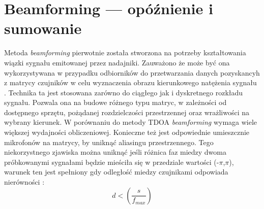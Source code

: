 \documentclass[eng,printmode]{mgr}
\begin{document}
\section{Beamforming --- opóźnienie i sumowanie}
Metoda {\em beamforming} pierwotnie została stworzona na potrzeby kształtowania wiązki sygnału emitowanej przez nadajniki. Zauważono że może być ona wykorzystywana w przypadku odbiorników do przetwarzania danych pozyskancyh z matrycy czujników w celu wyznaczenia obrazu kierunkowego natężenia sygnału . Technika ta jest stosowana zarówno do ciągłego jak i dyskretnego rozkładu sygnału. Pozwala ona na budowe różnego typu matryc, w zależności od dostępnego sprzętu, pożądanej rozdzielczości przestrzennej oraz wrażliwości na wybrany kierunek. W porównaniu do metody TDOA {\em beamforming} wymaga wiele większej wydajności obliczeniowej. Konieczne też jest odpowiednie umieszcznie mikrofonów na matrycy, by uniknąć aliasingu przestrzennego.
\newline Tego niekorzystnego zjawiska można uniknąć jeśli różnica faz miedzy dwoma próbkowanymi sygnałami będzie mieściła się w przedziale wartości (-$\pi$,$\pi$), warunek ten jest spełniony gdy odległość miedzy czujnikami odpowiada nierówności \cite{papez2013acoustic}:
\begin{equation}
 d <(\frac{s}{f_{max}}) 
\end{equation}
\end{document}
